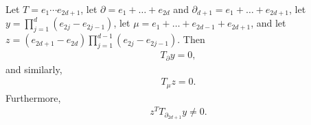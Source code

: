 \documentclass[10pt,a4paper]{amsart}
\begin{document}
\begin{prop}\label{prop:grouping-test}
	Let $T=e_1 \cdots e_{2d+1}$, let $\partial=e_1+\dots + e_{2d}$ and $ \partial_{d+1}=e_1+\dots + e_{2d+1} $,  let $y=\prod_{j=1}^d (e_{2j}-e_{2j-1})$, let $\mu=e_1+\dots+e_{2d-1}+e_{2d+1}$, and let $z=(e_{2d+1}-e_{2d})\prod_{j=1}^{d-1} (e_{2j}-e_{2j-1})$. Then
	\begin{align}\label{eq:evector_check}
		T_{\partial} y =0,
	\end{align}
	and similarly,
	\begin{align}\label{eq:evector_check2}
		T_{\mu} z =0.
	\end{align}
	Furthermore,
	\begin{align}\label{eq:contraction_nonzero}
		z^T T_{\partial_{2d+1}} y \neq 0.
	\end{align}
\end{prop}
\end{document}
